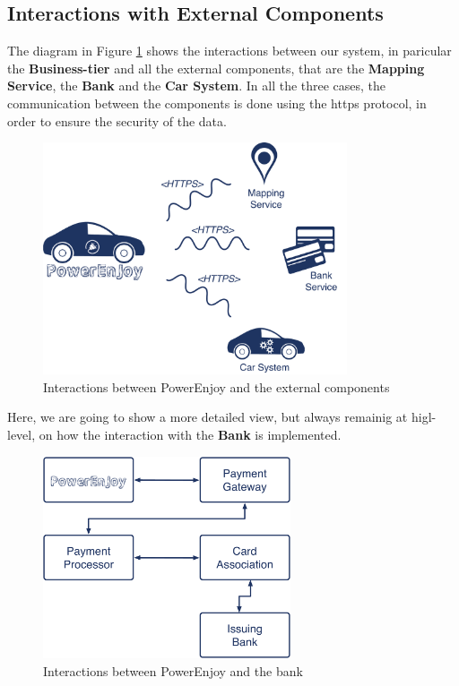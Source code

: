 \subsection{Interactions with External Components} \label{subsec:comp-extern}
The diagram in Figure \ref{fig:connection} shows the interactions between our system, in paricular the \textbf{Business-tier} and all the external components, that are the \textbf{Mapping Service}, the \textbf{Bank} and the \textbf{Car System}.
In all the three cases, the communication between the components is done using the \acs{https} protocol, in order to ensure the security of the data.

\begin{figure}[htbp]
\centering
\includegraphics[width=0.8\textwidth]{Images/Connection}
\caption{Interactions between PowerEnjoy and the external components}
\label{fig:connection}
\end{figure}
\clearpage

Here, we are going to show a more detailed view, but always remainig at higl-level, on how the interaction with the \textbf{Bank} is implemented.

\vspace{30pt}
\begin{figure}[htbp]
\centering
\includegraphics[width=0.65\textwidth]{Images/Bank}
\vspace{10pt}
\caption{Interactions between PowerEnjoy and the bank}
\label{fig:bank}
\end{figure}

